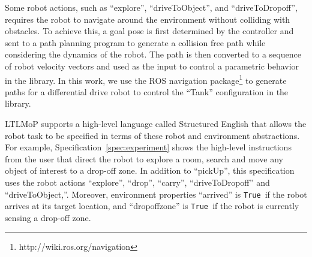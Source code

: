 \documentclass[conference]{IEEEtran}
\newcommand{\lt}{{\tt True }}
\newcommand{\lf}{{\tt False }}
\begin{document}
Some robot actions, such as ``explore'', ``driveToObject'', and ``driveToDropoff'', requires the robot to navigate around the environment without colliding with obstacles.
To achieve this, a goal pose is first determined by the controller and sent to a path planning program to generate a collision free path while considering the dynamics of the robot.
The path is then converted to a sequence of robot velocity vectors and used as the input to control a parametric behavior in the library.
In this work, we use the ROS navigation package\footnote{http://wiki.ros.org/navigation} to generate paths for a differential drive robot to control the ``Tank'' configuration in the library.


LTLMoP supports a high-level language called Structured English that allows the robot task to be specified in terms of these robot and environment abstractions.
For example, Specification~\ref{spec:experiment} shows the high-level instructions from the user that direct the robot to explore a room, search and move any object of interest to a drop-off zone.
In addition to ``pickUp'', this specification uses the robot actions ``explore'', ``drop'', ``carry'', ``driveToDropoff'' and ``driveToObject,''.
Moreover, environment properties ``arrived'' is \lt if the robot arrives at its target location, and ``dropoffzone'' is \lt if the robot is currently sensing a drop-off zone.
\end{document}
